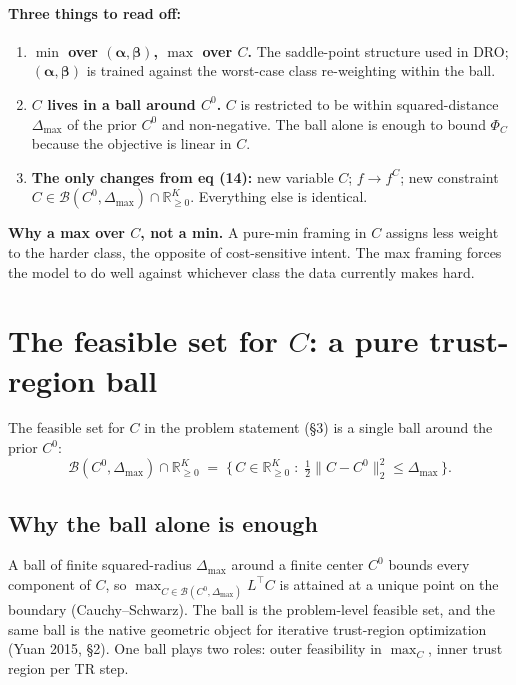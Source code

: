 \documentclass[11pt,a4paper]{article}
\begin{document}
\paragraph{Three things to read off:}
\begin{enumerate}[leftmargin=*,itemsep=2pt]
  \item \textbf{$\min$ over $(\boldsymbol{\alpha}, \boldsymbol{\beta})$, $\max$ over $C$.} The saddle-point structure used in DRO; $(\boldsymbol{\alpha},\boldsymbol{\beta})$ is trained against the worst-case class re-weighting within the ball.
  \item \textbf{$C$ lives in a ball around $C^0$.} $C$ is restricted to be within squared-distance $\Delta_{\max}$ of the prior $C^0$ and non-negative. The ball alone is enough to bound $\Phi_C$ because the objective is linear in $C$.
  \item \textbf{The only changes from eq (14):} new variable $C$; $f \to f^C$; new constraint $C \in \mathcal B(C^0,\Delta_{\max}) \cap \mathbb{R}^K_{\ge 0}$. Everything else is identical.
\end{enumerate}

\textbf{Why a max over $C$, not a min.} A pure-min framing in $C$ assigns less weight to the harder class, the opposite of cost-sensitive intent. The max framing forces the model to do well against whichever class the data currently makes hard.

\section{The feasible set for $C$: a pure trust-region ball}

The feasible set for $C$ in the problem statement (\S 3) is a single ball around the prior $C^0$:
\[
\mathcal B(C^0, \Delta_{\max}) \cap \mathbb{R}^K_{\ge 0}
\;=\; \Big\{\,C \in \mathbb{R}^K_{\ge 0} \;:\; \tfrac12\|C - C^0\|_2^2 \leq \Delta_{\max}\,\Big\}.
\]

\subsection{Why the ball alone is enough}

A ball of finite squared-radius $\Delta_{\max}$ around a finite center $C^0$ bounds every component of $C$, so $\max_{C \in \mathcal B(C^0,\Delta_{\max})} L^\top C$ is attained at a unique point on the boundary (Cauchy--Schwarz). The ball is the problem-level feasible set, and the same ball is the native geometric object for iterative trust-region optimization (Yuan 2015, \S 2). One ball plays two roles: outer feasibility in $\max_C$, inner trust region per TR step.
\end{document}
